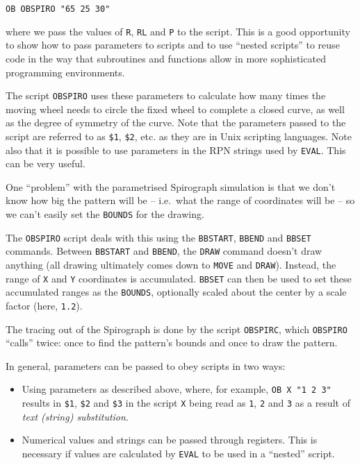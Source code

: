 \documentclass[a4paper,twoside,11pt]{article}
\newcommand{\newpara}{\par\vspace{4mm}\noindent}
\begin{document}
\begin{lstlisting}
OB OBSPIRO "65 25 30"
\end{lstlisting}

\newpara
where we pass the values of \texttt{R}, \texttt{RL} and \texttt{P} to
the script. This is a good opportunity to show how to pass parameters to
scripts and to use ``nested scripts'' to reuse code in the way that
subroutines and functions allow in more sophisticated programming
environments.

\newpara
The script \texttt{OBSPIRO} uses these parameters to calculate how many
times the moving wheel needs to circle the fixed wheel to complete a
closed curve, as well as the degree of symmetry of the curve. Note that
the parameters passed to the script are referred to as \texttt{\$1},
\texttt{\$2}, etc. as they are in Unix scripting languages. Note also
that it is possible to use parameters in the RPN strings used by
\texttt{EVAL}. This can be very useful.

\newpara
One ``problem'' with the parametrised Spirograph simulation is that we
don't know how big the pattern will be -- i.e.~what the range of
coordinates will be -- so we can't easily set the \texttt{BOUNDS} for
the drawing.

\newpara
The \texttt{OBSPIRO} script deals with this using the \texttt{BBSTART},
\texttt{BBEND} and \texttt{BBSET} commands. Between \texttt{BBSTART} and
\texttt{BBEND}, the \texttt{DRAW} command doesn't draw anything (all
drawing ultimately comes down to \texttt{MOVE} and \texttt{DRAW}).
Instead, the range of \texttt{X} and \texttt{Y} coordinates is
accumulated. \texttt{BBSET} can then be used to set these accumulated
ranges as the \texttt{BOUNDS}, optionally scaled about the center by a
scale factor (here, \texttt{1.2}).

\newpara
The tracing out of the Spirograph is done by the script
\texttt{OBSPIRC}, which \texttt{OBSPIRO} ``calls'' twice: once to find
the pattern's bounds and once to draw the pattern.

\newpara
In general, parameters can be passed to obey scripts in two ways:
\begin{itemize}
\item
  Using parameters as described above, where, for example,
  \texttt{OB\ X\ "1\ 2\ 3"} results in \texttt{\$1}, \texttt{\$2} and
  \texttt{\$3} in the script \texttt{X} being read as \texttt{1},
  \texttt{2} and \texttt{3} as a result of \emph{text (string)
  substitution}.
\item
  Numerical values and strings can be passed through registers. This is
  necessary if values are calculated by \texttt{EVAL} to be used in a
  ``nested'' script.
\end{itemize}
\end{document}
